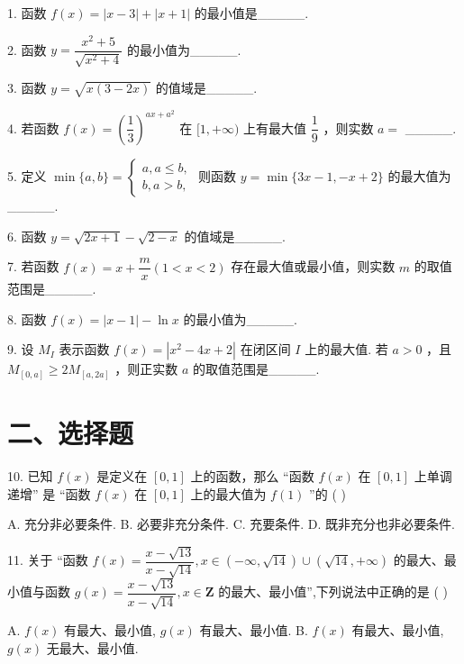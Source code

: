 1. 函数 $f\left( x\right)  = \left| {x - 3}\right|  + \left| {x + 1}\right|$ 的最小值是\_\_\_\_\_.

2. 函数 $y = \dfrac{{x}^{2} + 5}{\sqrt{{x}^{2} + 4}}$ 的最小值为\_\_\_\_\_.

3. 函数 $y = \sqrt{x\left( {3 - {2x}}\right) }$ 的值域是\_\_\_\_\_.

4. 若函数 $f\left( x\right)  = {\left( \dfrac{1}{3}\right) }^{{ax} + {a}^{2}}$ 在 $\lbrack 1, + \infty )$ 上有最大值 $\dfrac{1}{9}$ ，则实数 $a =$ \_\_\_\_\_.

5. 定义 $\min \{ a,b\}  = \left\{  \begin{array}{l} a,a \leq  b, \\  b,a > b, \end{array}\right.$ 则函数 $y = \min \{ {3x} - 1, - x + 2\}$ 的最大值为\_\_\_\_\_.

6. 函数 $y = \sqrt{{2x} + 1} - \sqrt{2 - x}$ 的值域是\_\_\_\_\_.

7. 若函数 $f\left( x\right)  = x + \dfrac{m}{x}\left( {1 < x < 2}\right)$ 存在最大值或最小值，则实数 $m$ 的取值范围是\_\_\_\_\_.

8. 函数 $f\left( x\right)  = \left| {x - 1}\right|  - \ln x$ 的最小值为\_\_\_\_\_.

9. 设 ${M}_{I}$ 表示函数 $f\left( x\right)  = \left| {{x}^{2} - {4x} + 2}\right|$ 在闭区间 $I$ 上的最大值. 若 $a > 0$ ，且 ${M}_{\left\lbrack  0,a\right\rbrack  } \geq  2{M}_{\left\lbrack  a,2a\right\rbrack  }$ ，则正实数 $a$ 的取值范围是\_\_\_\_\_.

\section*{二、选择题}

10. 已知 $f\left( x\right)$ 是定义在 $\left\lbrack  {0,1}\right\rbrack$ 上的函数，那么 “函数 $f\left( x\right)$ 在 $\left\lbrack  {0,1}\right\rbrack$ 上单调递增” 是 “函数 $f\left( x\right)$ 在 $\left\lbrack  {0,1}\right\rbrack$ 上的最大值为 $f\left( 1\right)$ ”的 ( )

A. 充分非必要条件. B. 必要非充分条件. C. 充要条件. D. 既非充分也非必要条件.

11. 关于 “函数 $f\left( x\right)  = \dfrac{x - \sqrt{13}}{x - \sqrt{14}},x \in  \left( {-\infty ,\sqrt{14}}\right)  \cup  \left( {\sqrt{14}, + \infty }\right)$ 的最大、最小值与函数 $g\left( x\right)  =  \dfrac{x - \sqrt{13}}{x - \sqrt{14}},x \in  \mathbf{Z}$ 的最大、最小值”,下列说法中正确的是 ( )

A. $f\left( x\right)$ 有最大、最小值, $g\left( x\right)$ 有最大、最小值. B. $f\left( x\right)$ 有最大、最小值, $g\left( x\right)$ 无最大、最小值.

